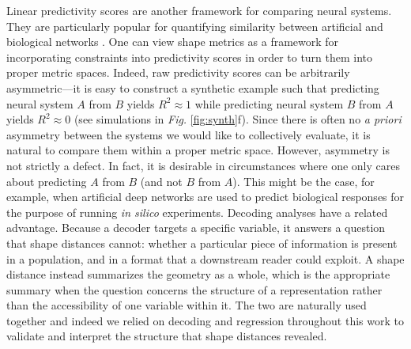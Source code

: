 Linear predictivity scores are another framework for comparing neural systems.
They are particularly popular for quantifying similarity between artificial and biological networks \parencite[e.g.][]{conwell2022can}.
One can view shape metrics as a framework for incorporating constraints into predictivity scores in order to turn them into proper metric spaces.
Indeed, raw predictivity scores can be arbitrarily asymmetric---it is easy to construct a synthetic example such that predicting neural system $A$ from $B$ yields $R^2 \approx 1$ while predicting neural system $B$ from $A$ yields $R^2 \approx 0$ (see simulations in \textit{Fig.} \ref{fig:synth}f). Since there is often no \textit{a priori} asymmetry between the systems we would like to collectively evaluate, it is natural to compare them within a proper metric space.
However, asymmetry is not strictly a defect.
In fact, it is desirable in circumstances where one only cares about predicting $A$ from $B$ (and not $B$ from $A$).
This might be the case, for example, when artificial deep networks are used to predict biological responses for the purpose of running \textit{in silico} experiments. Decoding analyses have a related advantage. Because a decoder targets a specific variable, it answers a question that shape distances cannot: whether a particular piece of information is present in a population, and in a format that a downstream reader could exploit. A shape distance instead summarizes the geometry as a whole, which is the appropriate summary when the question concerns the structure of a representation rather than the accessibility of one variable within it. The two are naturally used together and indeed we relied on decoding and regression throughout this work to validate and interpret the structure that shape distances revealed.




